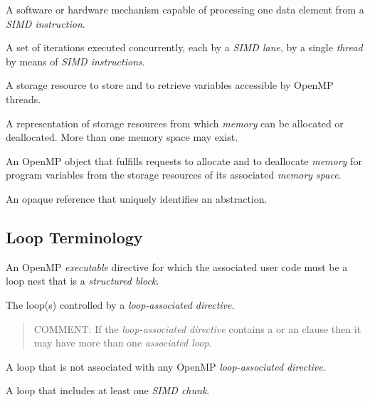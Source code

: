 \glossarydefstart
A software or hardware mechanism capable of processing one data element from a
\emph{SIMD instruction}.
\glossarydefend

\glossarydefstart
A set of iterations executed concurrently, each by a \emph{SIMD lane}, by 
a single \emph{thread} by means of \emph{SIMD instructions}.
\glossarydefend

\glossarydefstart
A storage resource to store and to retrieve variables accessible by 
OpenMP threads.
\glossarydefend

\glossarydefstart
A representation of storage resources from which \emph{memory} can 
be allocated or deallocated.  More than one memory space may exist.
\glossarydefend

\glossarydefstart
An OpenMP object that fulfills requests to allocate and to deallocate 
\emph{memory} for program variables from the storage resources of its 
associated \emph{memory space}.
\glossarydefend

\glossarydefstart
An opaque reference that uniquely identifies an abstraction.
\glossarydefend


%
%
% 
\subsection{Loop Terminology}
\label{subsec:Loop Terminology}
\glossarydefstart
An OpenMP \emph{executable} directive for which the associated user 
code must be a loop nest that is a \emph{structured block}.
\glossarydefend

\glossarydefstart
The loop(s) controlled by a \emph{loop-associated directive}.
\begin{quote}
COMMENT: If the \emph{loop-associated directive} contains a  or 
an \code{)} clause then it may have more than 
one \emph{associated loop}.
\end{quote}
\glossarydefend

\glossarydefstart
A loop that is not associated with any OpenMP \emph{loop-associated directive}.
\glossarydefend

\glossarydefstart
A loop that includes at least one \emph{SIMD chunk}.
\glossarydefend

